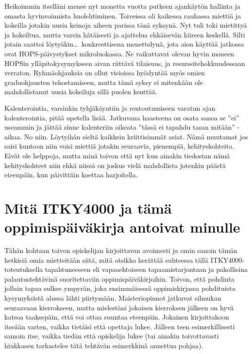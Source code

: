 \documentclass[utf8]{gradu3}
\begin{document}
Heikoimmin itselläni menee nyt monetta vuotta putkeen ajankäytön hallinta ja
omasta hyvinvoinnista huolehtiminen. Toiveissa oli kaikessa rauhassa miettiä ja
kokeilla jotakin uusia keinoja aiheen parissa tänä syksynä. Nyt tuli toki
mietittyä ja kokeiltua, mutta varsin hätäisesti ja ajattelua ehkäisevän kiireen
keskellä. Silti jotain saattoi löytyäkin\ldots\ konkreettisena menettelynä, jota
aion käyttää jatkossa ovat HOPS-päivystykset mikroluokassa. Ne vaikuttavat
olevan hyvin moneen HOPSin ylläpitokysymykseen aivan riittävä tilaisuus, ja
resurssitehokkuudessaan verraton.
%
Ryhmäohjauksia on ollut visioissa hyödyntää myös omien graduohjausten
tehostamiseen, mutta tämä syksy ei mitenkään ole mahdollistanut uusia kokeiluja
sillä puolen kenttää.

Kalenterointia, varsinkin tyhjäkäyntiin ja rentoutumiseen varatun ajan
kalenterointia, pitää opetella lisää. Jatkuvana haasteena on osata sanoa se
''ei'' useammin ja jättää sinne kalenteriin oikeata ''tässä ei tapahdu tasan
mitään'' -aikaa. No niin. Löytyihän sieltä kaikkein kriittisimmät asiat. Nämä
muutamat jos saisi kuntoon niin voisi miettiä jotakin seuraavia, pienempiä,
kehityskohteita. Eivät ole helppoja, mutta minä toivon että nyt kun ainakin
tiedostan nämä kehityskohteet niin ehkä niissä on joskus vielä mahdollista
jotenkin päästä eteenpäin, kun päivittäin koettaa harjoitella.

\section{Mitä ITKY4000 ja tämä oppimispäiväkirja antoivat minulle}

Tähän kohtaan toivon opiskelijan kirjoittavan avoimesti ja omin sanoin tämän
hetkisiä omia mietteitään siitä, mitä otsikko herättää suhteessa tällä
ITKY4000-toteutuksella tapahtuneeseen eli vapaaehtoiseen tapaamistarjontaan ja
pakollisina palautustehtävinä suoritettaviin oppimispäiväkirjoihin.
%
Toivon, että pohdinta jollain tapaa sulkee ympyrän, joka ensimmäisessä
oppimiskirjassa pohdituista kysymyksistä alussa lähti piirtymään.
%
Maisteriopinnot jatkuvat silmukan seuraavaan kierrokseen, mutta mielestäni
jokaisen kierroksen jälkeen on hyvä katsoa taaksepäin, että voi ottaa suuntaa
eteenpäin.
%
Jokainen kirjoittakoon itseään varten, vaikka tietäisi että opettaja lukee.
Jälleen teen esimerkillisesti samoin itse, vaikka tiedän että opiskelija lukee
(tai ainakin toivottavasti hiukkasen tarkastelee tätä tehtävän esimerkkinä
annettua pohjaa).
\end{document}
